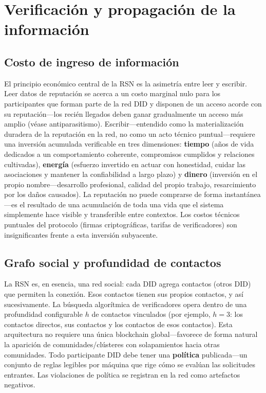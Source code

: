 \documentclass[11pt,a4paper,twocolumn]{article}
\begin{document}
\section{Verificación y propagación de la información}

\subsection{Costo de ingreso de información}

El principio económico central de la RSN es la asimetría entre leer y escribir. Leer datos de reputación se acerca a un costo marginal nulo para los participantes que forman parte de la red DID y disponen de un acceso acorde con su reputación---los recién llegados deben ganar gradualmente un acceso más amplio (véase antiparasitismo). Escribir---entendido como la materialización duradera de la reputación en la red, no como un acto técnico puntual---requiere una inversión acumulada verificable en tres dimensiones: \textbf{tiempo} (años de vida dedicados a un comportamiento coherente, compromisos cumplidos y relaciones cultivadas), \textbf{energía} (esfuerzo invertido en actuar con honestidad, cuidar las asociaciones y mantener la confiabilidad a largo plazo) y \textbf{dinero} (inversión en el propio nombre---desarrollo profesional, calidad del propio trabajo, resarcimiento por los daños causados). La reputación no puede comprarse de forma instantánea---es el resultado de una acumulación de toda una vida que el sistema simplemente hace visible y transferible entre contextos. Los costos técnicos puntuales del protocolo (firmas criptográficas, tarifas de verificadores) son insignificantes frente a esta inversión subyacente.

\subsection{Grafo social y profundidad de contactos}

La RSN es, en esencia, una red social: cada DID agrega contactos (otros DID) que permiten la conexión. Esos contactos tienen sus propios contactos, y así sucesivamente. La búsqueda algorítmica de verificadores opera dentro de una profundidad configurable $h$ de contactos vinculados (por ejemplo, $h=3$: los contactos directos, sus contactos y los contactos de esos contactos). Esta arquitectura no requiere una única blockchain global---favorece de forma natural la aparición de comunidades/clústeres con solapamientos hacia otras comunidades. Todo participante DID debe tener una \textbf{política} publicada---un conjunto de reglas legibles por máquina que rige cómo se evalúan las solicitudes entrantes. Las violaciones de política se registran en la red como artefactos negativos.
\end{document}
